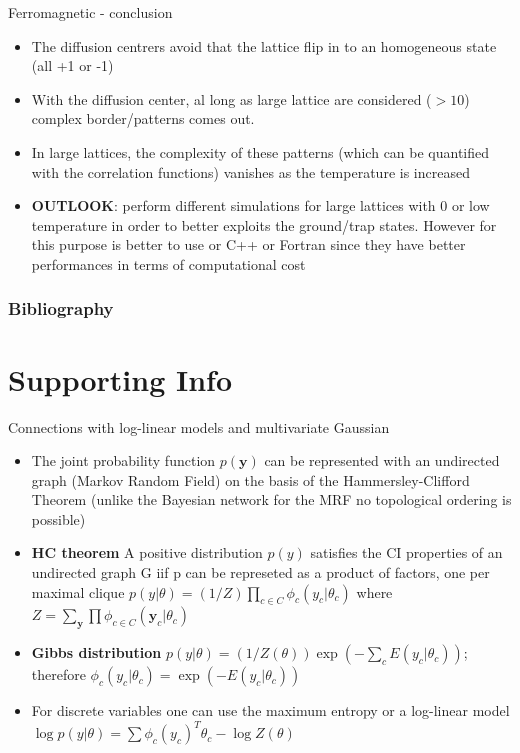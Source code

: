\documentclass{beamer}
\begin{document}
\begin{frame}{Ferromagnetic - conclusion}
\begin{itemize}
\item The diffusion centrers avoid that the lattice flip in to an homogeneous state (all +1 or -1) 
\item With the diffusion center, al long as large lattice are considered ($>10$) complex border/patterns comes out. 
\item In large lattices, the complexity of these patterns (which can be quantified with the correlation functions) vanishes as the temperature is increased 
\item \textbf{OUTLOOK}: perform different simulations for large lattices with 0 or low temperature in order to better exploits the ground/trap states. However for this purpose is better to use or C++ or Fortran since they have better performances in terms of computational cost 
\end{itemize}

\end{frame}



\begin{frame}[t,allowframebreaks]
\frametitle{Bibliography}
\printbibliography
\end{frame}



\section{Supporting Info}





\begin{frame}{Connections with log-linear models and multivariate Gaussian   \cite{murphy2012machine}}
\begin{itemize}
\item The joint probability function $p(\textbf{y})$ can be represented with an undirected graph (Markov Random Field) on the basis of the Hammersley-Clifford Theorem (unlike the Bayesian network for the MRF no topological ordering is possible) 
\item \textbf{HC theorem} A positive distribution $p(y)$ satisfies the CI properties of an undirected graph G iif p can be represeted as a product of factors, one per maximal clique $p(y|\theta)=(1/Z)\prod_{c\in C} \phi_{c}(y_{c}|\theta_{c})$ where $Z=\sum_{\textbf{y}}\prod\phi_{c\in C}(\textbf{y}_{c}|\theta_{c})$
\item \textbf{Gibbs distribution} $p(y|\theta)=(1/Z(\theta))\exp\left(-\sum_{c}E(y_{c}|\theta_{c})\right)$; therefore $\phi_{c}(y_{c}|\theta_{c})=\exp(-E(y_{c}|\theta_{c}))$
\item For discrete variables one can use the maximum entropy or a log-linear model $\log p(y|\theta)=\sum\phi_{c}(y_{c})^{T}\theta_{c}-\log Z(\theta)$

\end{itemize}
\end{frame}
\end{document}
